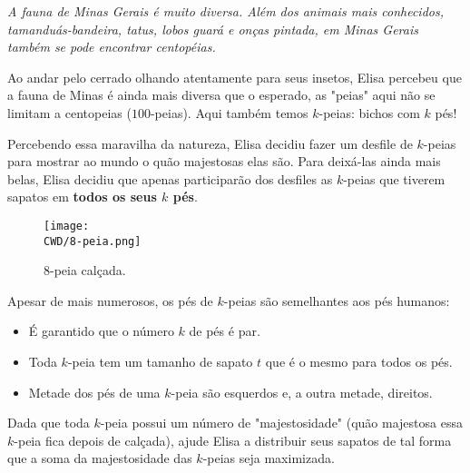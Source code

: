 %

\textit{
  A fauna de Minas Gerais é muito diversa. Além dos animais mais conhecidos, tamanduás-bandeira, tatus, lobos guará e onças pintada, em Minas Gerais também se pode encontrar centopéias. 
  }
  
  Ao andar pelo cerrado olhando atentamente para seus insetos, Elisa percebeu que a fauna de Minas é ainda mais diversa que o esperado, as "peias" aqui não se limitam a centopeias ($100$-peias). Aqui também temos $k$-peias: bichos com $k$ pés!
    
  Percebendo essa maravilha da natureza, Elisa decidiu fazer um desfile de $k$-peias para mostrar ao mundo o quão majestosas elas são. Para deixá-las ainda mais belas, Elisa decidiu que apenas participarão dos desfiles as $k$-peias que tiverem sapatos em \textbf{todos os seus $k$ pés}. 
  
  \begin{figure}[H]
    \centering
    \texttt{[image: \\CWD/8-peia.png]}
    \caption{8-peia calçada.}
  \end{figure}

  Apesar de mais numerosos, os pés de $k$-peias são semelhantes aos pés humanos:
\begin{itemize}
  \item É garantido que o número $k$ de pés é par.
  \item Toda $k$-peia tem um tamanho de sapato $t$ que é o mesmo para todos os pés.
  \item Metade dos pés de uma $k$-peia são esquerdos e, a outra metade, direitos.
\end{itemize}

Dada que toda $k$-peia possui um número de "majestosidade" (quão majestosa essa $k$-peia fica depois de calçada), ajude Elisa a distribuir seus sapatos de tal forma que a soma da majestosidade das $k$-peias seja maximizada.

%

